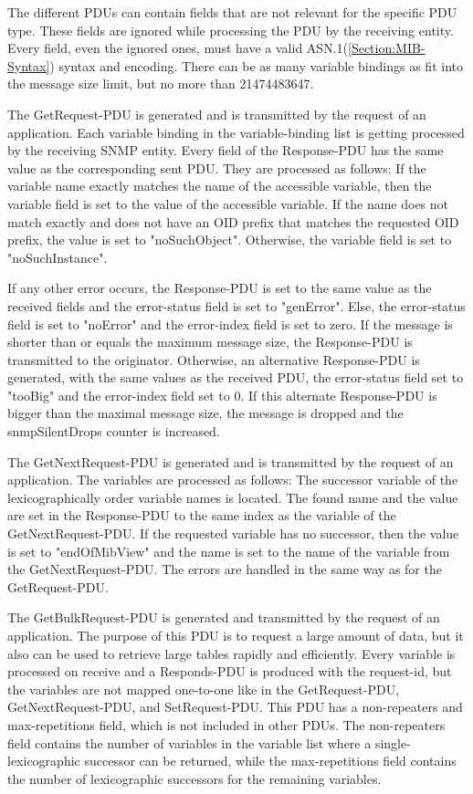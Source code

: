 The different PDUs can contain fields that are not relevant for the specific PDU type. These fields are ignored while processing the PDU by the receiving entity. Every field, even the ignored ones, must have a valid ASN.1(\ref{Section:MIB-Syntax}) syntax and encoding. There can be as many variable bindings as fit into the message size limit, but no more than 21474483647.

\newpage
The GetRequest-PDU is generated and is transmitted by the request of an application. Each variable binding in the variable-binding list is getting processed by the receiving SNMP entity. Every field of the Response-PDU has the same value as the corresponding sent PDU. They are processed as follows: If the variable name exactly matches the name of the accessible variable, then the variable field is set to the value of the accessible variable.  If the name does not match exactly and does not have an OID prefix that matches the requested OID prefix, the value is set to "noSuchObject". Otherwise, the variable field is set to "noSuchInstance".

If any other error occurs, the Response-PDU is set to the same value as the received fields and the error-status field is set to "genError". Else, the error-status field is set to "noError" and the error-index field is set to zero. If the message is shorter than or equals the maximum message size, the Response-PDU is transmitted to the originator. Otherwise, an alternative Response-PDU is generated, with the same values as the received PDU, the error-status field set to "tooBig" and the error-index field set to 0. If this alternate Response-PDU is bigger than the maximal message size, the message is dropped and the snmpSilentDrops counter is increased.

The GetNextRequest-PDU is generated and is transmitted by the request of an application. The variables are processed as follows: The successor variable of the lexicographically order variable names is located. The found name and the value are set in the Response-PDU to the same index as the variable of the GetNextRequest-PDU. If the requested variable has no successor, then the value is set to "endOfMibView" and the name is set to the name of the variable from the GetNextRequest-PDU. The errors are handled in the same way as for the GetRequest-PDU.

The GetBulkRequest-PDU is generated and transmitted by the request of an application. The purpose of this PDU is to request a large amount of data, but it also can be used to retrieve large tables rapidly and efficiently. Every variable is processed on receive and a Responds-PDU is produced with the request-id, but the variables are not mapped one-to-one like in the GetRequest-PDU, GetNextRequest-PDU, and SetRequest-PDU. This PDU has a non-repeaters and max-repetitions field, which is not included in other PDUs. The non-repeaters field contains the number of variables in the variable list where a single-lexicographic successor can be returned, while the max-repetitions field contains the number of lexicographic successors for the remaining variables.

